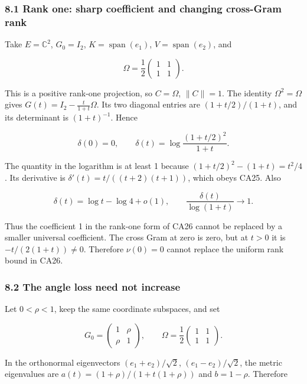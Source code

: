 \documentclass[11pt]{article}
\begin{document}
\subsubsection{8.1 Rank one: sharp coefficient and changing cross-Gram rank}\label{rank-one-sharp-coefficient-and-changing-cross-gram-rank}

Take \(E=\mathbb C^2\), \(G_0=I_2\), \(K=\operatorname{span}(e_1)\), \(V=\operatorname{span}(e_2)\), and

\[
\Omega=\frac12\begin{pmatrix}1&1\\1&1\end{pmatrix}.
\]

This is a positive rank-one projection, so \(C=\Omega\), \(\|C\|=1\). The identity \(\Omega^2=\Omega\) gives \(G(t)=I_2-\frac{t}{1+t}\Omega\). Its two diagonal entries are \((1+t/2)/(1+t)\), and its determinant is \((1+t)^{-1}\). Hence

\[
\delta(0)=0,\qquad
\delta(t)=\log\frac{(1+t/2)^2}{1+t}.
\tag{CA39}
\]

The quantity in the logarithm is at least 1 because \((1+t/2)^2-(1+t)=t^2/4\). Its derivative is \(\delta'(t)=t/((t+2)(t+1))\), which obeys CA25. Also

\[
\delta(t)=\log t-\log4+o(1),\qquad
\frac{\delta(t)}{\log(1+t)}\longrightarrow1.
\]

Thus the coefficient 1 in the rank-one form of CA26 cannot be replaced by a smaller universal coefficient. The cross Gram at zero is zero, but at \(t>0\) it is \(-t/(2(1+t))\ne0\). Therefore \(\nu(0)=0\) cannot replace the uniform rank bound in CA26.

\subsubsection{8.2 The angle loss need not increase}\label{the-angle-loss-need-not-increase}

Let \(0<\rho<1\), keep the same coordinate subspaces, and set

\[
G_0=\begin{pmatrix}1&\rho\\\rho&1\end{pmatrix},\qquad
\Omega=\frac12\begin{pmatrix}1&1\\1&1\end{pmatrix}.
\]

In the orthonormal eigenvectors \((e_1+e_2)/\sqrt2\), \((e_1-e_2)/\sqrt2\), the metric eigenvalues are \(a(t)=(1+\rho)/(1+t(1+\rho))\) and \(b=1-\rho\). Therefore
\end{document}
